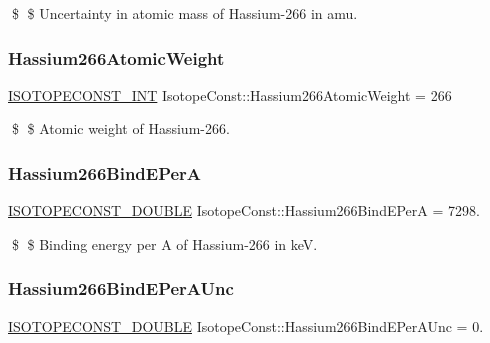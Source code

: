 \$ \$ Uncertainty in atomic mass of Hassium-\/266 in amu. \mbox{\label{group___isotope_const-_hassium-_hs266_ga62526f21c065a873878953a5176e1172}} 
\subsubsection{\texorpdfstring{Hassium266\+Atomic\+Weight}{Hassium266AtomicWeight}}
{\footnotesize\ttfamily \mbox{\hyperlink{group___isotope_const-_macros_ga5f18360b3e99483a35c32d789e62621c}{I\+S\+O\+T\+O\+P\+E\+C\+O\+N\+S\+T\+\_\+\+I\+NT}} Isotope\+Const\+::\+Hassium266\+Atomic\+Weight = 266}

\$ \$ Atomic weight of Hassium-\/266. \mbox{\label{group___isotope_const-_hassium-_hs266_gaa7716cdb77a08cd86c341a7e835b6f8d}} 
\subsubsection{\texorpdfstring{Hassium266\+Bind\+E\+PerA}{Hassium266BindEPerA}}
{\footnotesize\ttfamily \mbox{\hyperlink{group___isotope_const-_macros_ga8f45a7272ce02c0b4c65c44636ed719a}{I\+S\+O\+T\+O\+P\+E\+C\+O\+N\+S\+T\+\_\+\+D\+O\+U\+B\+LE}} Isotope\+Const\+::\+Hassium266\+Bind\+E\+PerA = 7298.}

\$ \$ Binding energy per A of Hassium-\/266 in keV. \mbox{\label{group___isotope_const-_hassium-_hs266_ga9f7de40beae22bb5c982b728643d50b4}} 
\subsubsection{\texorpdfstring{Hassium266\+Bind\+E\+Per\+A\+Unc}{Hassium266BindEPerAUnc}}
{\footnotesize\ttfamily \mbox{\hyperlink{group___isotope_const-_macros_ga8f45a7272ce02c0b4c65c44636ed719a}{I\+S\+O\+T\+O\+P\+E\+C\+O\+N\+S\+T\+\_\+\+D\+O\+U\+B\+LE}} Isotope\+Const\+::\+Hassium266\+Bind\+E\+Per\+A\+Unc = 0.}

